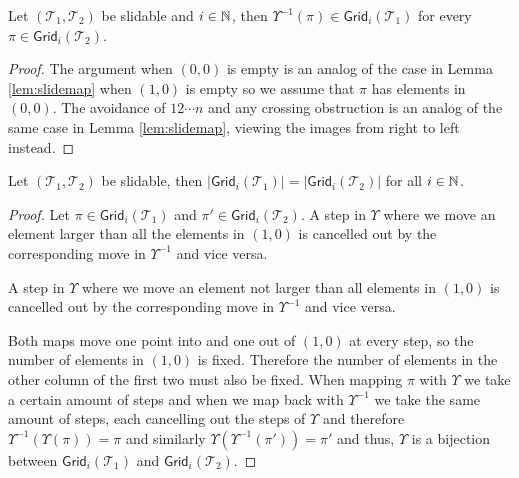 \begin{lemma}
Let $(\mathcal{T}_1,\mathcal{T}_2)$ be slidable and $i \in \mathbb{N}$, then $\Upsilon^{-1}(\pi) \in \textsf{Grid}_i(\mathcal{T}_1)$ for every $\pi \in \textsf{Grid}_i(\mathcal{T}_2)$.
\end{lemma}
\begin{proof}
The argument when $(0,0)$ is empty is an analog of the case in Lemma \ref{lem:slidemap} when $(1,0)$ is empty so we assume that $\pi$ has elements in $(0,0)$. The avoidance of $12\cdots n$ and any crossing obstruction is an analog of the same case in Lemma \ref{lem:slidemap}, viewing the images from right to left instead.
\end{proof}

\begin{proposition}
Let $(\mathcal{T}_1,\mathcal{T}_2)$ be slidable, then $|\textsf{Grid}_i(\mathcal{T}_1)| = |\textsf{Grid}_i(\mathcal{T}_2)|$ for all $i\in\mathbb{N}$.
\end{proposition}
\begin{proof}
Let $\pi \in \textsf{Grid}_i(\mathcal{T}_1)$ and $\pi' \in \textsf{Grid}_i(\mathcal{T}_2)$. A step in $\Upsilon$ where we move an element larger than all the elements in $(1,0)$ is cancelled out by the corresponding move in $\Upsilon^{-1}$ and vice versa.

\begin{center}

\end{center}

A step in $\Upsilon$ where we move an element not larger than all elements in $(1,0)$ is cancelled out by the corresponding move in $\Upsilon^{-1}$ and vice versa.

\begin{center}

\end{center}

Both maps move one point into and one out of $(1,0)$ at every step, so the number of elements in $(1,0)$ is fixed. Therefore the number of elements in the other column of the first two must also be fixed. When mapping $\pi$ with $\Upsilon$ we take a certain amount of steps and when we map back with $\Upsilon^{-1}$ we take the same amount of steps, each cancelling out the steps of $\Upsilon$ and therefore $\Upsilon^{-1}(\Upsilon(\pi)) = \pi$ and similarly $\Upsilon\left(\Upsilon^{-1}(\pi')\right) = \pi'$ and thus, $\Upsilon$ is a bijection between $\textsf{Grid}_i(\mathcal{T}_1)$ and $\textsf{Grid}_i(\mathcal{T}_2)$.
\end{proof}

